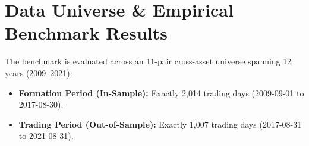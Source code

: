 \documentclass[11pt, a4paper]{article}
\begin{document}
\section{Data Universe \& Empirical Benchmark Results}

The benchmark is evaluated across an 11-pair cross-asset universe spanning 12 years (2009--2021):
\begin{itemize}
    \item \textbf{Formation Period (In-Sample):} Exactly 2,014 trading days (2009-09-01 to 2017-08-30).
    \item \textbf{Trading Period (Out-of-Sample):} Exactly 1,007 trading days (2017-08-31 to 2021-08-31).
\end{itemize}
\end{document}
